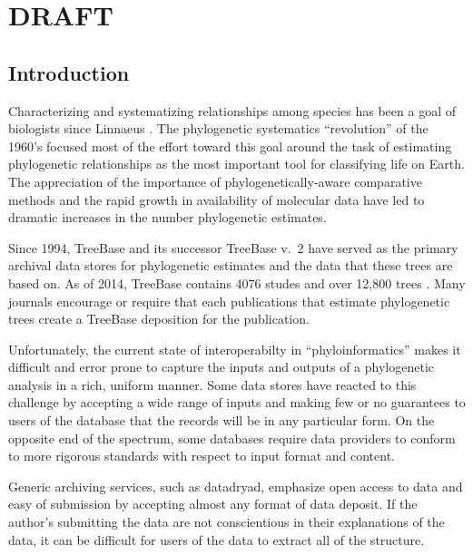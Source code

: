 \documentclass[a4paper,10pt]{article}
\begin{document}
\section{DRAFT}
\subsection{Introduction}
Characterizing and systematizing relationships among species has been a goal of biologists since Linnaeus \cite{Linne1758}.
The phylogenetic systematics ``revolution'' of the 1960's focused most of the effort toward this goal around the 
    task of estimating phylogenetic relationships as the most important tool for classifying life on Earth.
The appreciation of the importance of phylogenetically-aware comparative methods \citep[e.g.][]{Felsenstein1985Comp} and 
the rapid growth in availability of molecular data have led to dramatic increases in the number phylogenetic estimates.

Since 1994, TreeBase \citep{SandersonDPE1994} and its successor TreeBase v.~2 have served
    as the primary archival data stores for phylogenetic estimates and the data that these trees are based on.
As of 2014, TreeBase contains 4076 studes and over 12,800 trees \citep{TreeBaseWebCite}.
Many journals encourage or require that each publications that estimate phylogenetic trees create a TreeBase
    deposition for the publication.

Unfortunately, the current state of interoperabilty in ``phyloinformatics'' makes it difficult and error prone
to capture the inputs and outputs of a phylogenetic analysis in a rich, uniform manner.
Some data stores have reacted to this challenge by accepting a wide range of inputs and making few or no
    guarantees to users of the database that the records will be in any particular form.
On the opposite end of the spectrum, some databases require data providers to conform to more rigorous
    standards with respect to input format and content.

Generic archiving services, such as datadryad\citep{Dryad}, emphasize open access to data and easy of submission by
    accepting almost any format of data deposit.
If the author's submitting the data are not conscientious in their explanations of the data, it can be difficult
    for users of the data to extract all of the structure.
\end{document}
